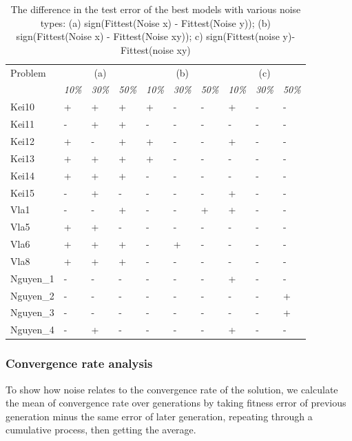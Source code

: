 \begin{table}
\caption{The difference in the test error of the best models with various noise types: (a) sign(Fittest(Noise x) - Fittest(Noise y)); (b) sign(Fittest(Noise x) - Fittest(Noise xy)); c) sign(Fittest(noise y)-Fittest(noise xy)}
\label{tab:difFittest}       %
\begin{tabular}{l|lll|lll|lll}
\hline\noalign{\smallskip}
Problem & \multicolumn{3}{c|}{(a)} & \multicolumn{3}{c|}{(b)} & \multicolumn{3}{c}{(c)} \\
 & \multicolumn{1}{c}{\textit{10\%}} & \multicolumn{1}{c}{\textit{30\%}} & \multicolumn{1}{c|}{\textit{50\%}} & \multicolumn{1}{c}{\textit{10\%}} & \multicolumn{1}{c}{\textit{30\%}} & \multicolumn{1}{c|}{\textit{50\%}} & \multicolumn{1}{c}{\textit{10\%}} & \multicolumn{1}{c}{\textit{30\%}} & \multicolumn{1}{c}{\textit{50\%}} \\
\hline
Kei10 & + & + & + & + & - & - & + & - & - \\
Kei11 & - & + & + & - & - & - & - & - & - \\
Kei12 & + & - & + & + & - & - & + & - & - \\
Kei13 & + & + & + & + & - & - & - & - & - \\
Kei14 & + & + & + & - & - & - & - & - & - \\
Kei15 & - & + & - & - & - & - & + & - & - \\
Vla1 & - & - & + & - & - & + & + & - & - \\
Vla5 & + & + & - & - & - & - & - & - & - \\
Vla6 & + & + & + & - & + & - & - & - & - \\
Vla8 & + & + & + & - & - & - & - & - & - \\
Nguyen\_1 & - & - & - & - & - & - & + & - & - \\
Nguyen\_2 & - & - & - & - & - & - & - & - & + \\
Nguyen\_3 & - & - & - & - & - & - & - & - & + \\
Nguyen\_4 & - & + & - & - & - & - & + & - & - \\
\hline
\end{tabular}
\end{table}


\subsubsection {Convergence rate analysis}
\label{AnaDiffCR}

To show how noise relates to the convergence rate of the solution, we calculate the mean of convergence rate over generations by taking fitness error of previous generation minus the same error of later generation, repeating through a cumulative process, then getting the average.

